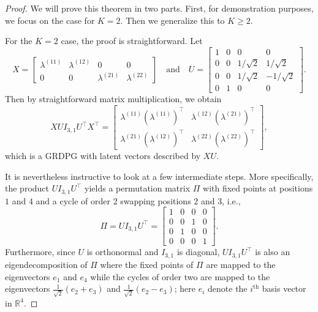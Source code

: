 \documentclass[12pt]{article}
\begin{document}
\begin{proof}
We will prove this theorem in two parts. First, for demonstration purposes, we focus on the case for $K = 2$. Then we generalize this to $K \geq 2$. 

For the $K = 2$ case, the proof is straightforward. Let 
$$X = \begin{bmatrix}
\lambda^{(11)} & \lambda^{(12)} & 0 & 0 \\
0 & 0 & \lambda^{(21)} & \lambda^{(22)}
\end{bmatrix} \quad \text{and} \quad
U = \begin{bmatrix} 1 & 0 & 0 & 0 \\
0 & 0 & 1 / \sqrt{2} & 1 / \sqrt{2} \\
0 & 0 & 1 / \sqrt{2} & - 1 / \sqrt{2} \\
0 & 1 & 0 & 0 \end{bmatrix}.$$
Then by straightforward matrix multiplication, we obtain 
\[X U I_{3, 1} U^\top X^\top =
\begin{bmatrix}
  \lambda^{(11)} (\lambda^{(11)})^\top & \lambda^{(12)} (\lambda^{(21)})^\top \\
  \lambda^{(21)} (\lambda^{(12)})^\top & \lambda^{(22)} (\lambda^{(22)})^\top
\end{bmatrix}, \]
which is a GRDPG with latent vectors described by $X U$.

It is nevertheless instructive to look at a few intermediate steps. 
More specifically, the product $U I_{3, 1} U^\top$ 
yields a permutation matrix $\Pi$ with fixed points at positions $1$ and $4$ 
and a cycle of order 2 swapping positions $2$ and $3$, i.e., 
$$\Pi = U I_{3, 1} U^\top = \begin{bmatrix} 1 & 0 & 0 & 0 \\
  0 & 0 & 1 & 0 \\
  0 & 1 & 0 & 0 \\
  0 & 0 & 0 & 1
\end{bmatrix}.$$
Furthermore, since $U$ is orthonormal and $I_{3, 1}$ is diagonal, $U I_{3, 1} U^\top$
is also an eigendecomposition of $\Pi$ where the fixed
points of $\Pi$ are mapped to the eigenvectors $e_1$ and $e_4$
while the cycles of order two are mapped to the eigenvectors  
$\tfrac{1}{\sqrt{2}}(e_{2} + e_3)$ and $\tfrac{1}{\sqrt{2}}(e_{2} -
e_3)$; here $e_i$ denote the $i^\mathrm{th}$ basis vector in $\mathbb{R}^{4}$.


\end{proof}
\end{document}
